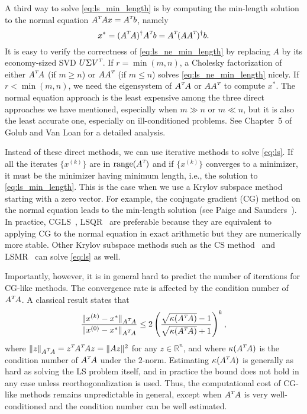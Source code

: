 \documentclass{siamltex}
\newcommand{\T}{^{\raisebox{0.09em}{\hbox{\tiny $T$}}\hspace{-0.1em}}}
\begin{document}
A third way to solve \eqref{eq:ls_min_length} is by computing the min-length
solution to the normal equation $A\T A x = A\T b$, namely
\begin{equation}
  \label{eq:ls_ne_min_length}
  x^* = (A\T A)^\dagger A\T b = A\T (A A\T)^\dagger b.
\end{equation}
It is easy to verify the correctness of \eqref{eq:ls_ne_min_length} by replacing
$A$ by its economy-sized SVD $U \Sigma V\T$. If $r = \min(m,n)$, a Cholesky
factorization of either $A\T A$ (if $m \geq n$) or $AA\T$ (if $m \leq n$) solves
\eqref{eq:ls_ne_min_length} nicely. If $r < \min(m,n)$, we need the eigensystem
of $A\T A$ or $A A\T$ to compute $x^*$.  The normal equation approach is the
least expensive among the three direct approaches we have mentioned, especially
when $m \gg n$ or $m \ll n$, but it is also the least accurate one, especially
on ill-conditioned problems.  See Chapter~5 of Golub and Van Loan
\cite{golub1996matrix} for a detailed analysis.

Instead of these direct methods, we can use iterative methods to solve
\eqref{eq:ls}.  If all the iterates $\{ x^{(k)} \}$ are in $\text{range}(A\T)$
and if $\{ x^{(k)} \}$ converges to a minimizer, it must be the minimizer having
minimum length, i.e., the solution to \eqref{eq:ls_min_length}.  This is the
case when we use a Krylov subspace method starting with a zero vector.  For
example, the conjugate gradient (CG) method on the normal equation leads to the
min-length solution (see Paige and Saunders~\cite{paige1975solution}).  In
practice, CGLS~\cite{hestenesmethods}, LSQR~\cite{paige1982lsqr} are preferable
because they are equivalent to applying CG to the normal equation in exact
arithmetic but they are numerically more stable. Other Krylov subspace methods
such as the CS method~\cite{golub1961chebyshev}
and LSMR~\cite{fong2011lsmr} can solve \eqref{eq:ls} as well.

Importantly, however, it is in general hard to predict the number of iterations
for CG-like methods.  The convergence rate is affected by the condition number
of $A\T A$.  A classical result \cite[p.187]{luenberger1973introduction} states
that
\begin{equation}
  \label{eq:cg_convergence_rate}
  \frac{\| x^{(k)} - x^* \|_{A\T A}}{\|x^{(0)} - x^*\|_{A\T A}} \leq 2 \left( \frac{\sqrt{\kappa(A\T A)} - 1}{\sqrt{\kappa(A\T A)} + 1} \right)^k,
\end{equation}
where $\| z \|_{A\T A} = z\T A\T A z = \|A z\|^2$ for any $z \in \mathbb{R}^n$,
and where $\kappa(A\T A)$ is the condition number of $A\T A$ under the $2$-norm.
Estimating $\kappa(A\T A)$ is generally as hard as solving the LS problem
itself, and in practice the bound does not hold in any case unless
reorthogonalization is used.  Thus, the computational cost of CG-like methods
remains unpredictable in general, except when $A\T A$ is very well-conditioned
and the condition number can be well estimated.
\end{document}
